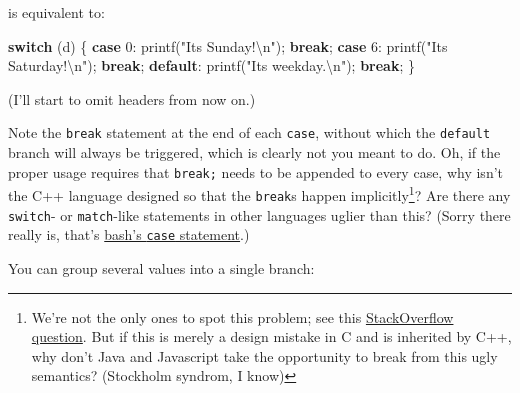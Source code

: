 \documentclass[
]{book}
\newenvironment{Shaded}{\begin{snugshade}}{\end{snugshade}}
\newcommand{\ControlFlowTok}[1]{\textcolor[rgb]{0.13,0.29,0.53}{\textbf{#1}}}
\newcommand{\DecValTok}[1]{\textcolor[rgb]{0.00,0.00,0.81}{#1}}
\newcommand{\NormalTok}[1]{#1}
\newcommand{\SpecialCharTok}[1]{\textcolor[rgb]{0.00,0.00,0.00}{#1}}
\newcommand{\StringTok}[1]{\textcolor[rgb]{0.31,0.60,0.02}{#1}}
\begin{document}
is equivalent to:

\begin{Shaded}
\begin{Highlighting}[]
\ControlFlowTok{switch}\NormalTok{ (d)}
\NormalTok{\{}
\ControlFlowTok{case} \DecValTok{0}\NormalTok{:}
\NormalTok{    printf(}\StringTok{"It\textquotesingle{}s Sunday!}\SpecialCharTok{\textbackslash{}n}\StringTok{"}\NormalTok{);}
    \ControlFlowTok{break}\NormalTok{;}
\ControlFlowTok{case} \DecValTok{6}\NormalTok{:}
\NormalTok{    printf(}\StringTok{"It\textquotesingle{}s Saturday!}\SpecialCharTok{\textbackslash{}n}\StringTok{"}\NormalTok{);}
    \ControlFlowTok{break}\NormalTok{;}
\ControlFlowTok{default}\NormalTok{:}
\NormalTok{    printf(}\StringTok{"It\textquotesingle{}s weekday.}\SpecialCharTok{\textbackslash{}n}\StringTok{"}\NormalTok{);}
    \ControlFlowTok{break}\NormalTok{;}
\NormalTok{\}}
\end{Highlighting}
\end{Shaded}

(I'll start to omit headers from now on.)

Note the \texttt{break} statement at the end of each \texttt{case}, without which the \texttt{default} branch will always be triggered, which is clearly not you meant to do. Oh, if the proper usage requires that \texttt{break;} needs to be appended to every case, why isn't the C++ language designed so that the \texttt{break}s happen implicitly\footnote{We're not the only ones to spot this problem; see this \href{https://stackoverflow.com/questions/252489/why-was-the-switch-statement-designed-to-need-a-break}{StackOverflow question}. But if this is merely a design mistake in C and is inherited by C++, why don't Java and Javascript take the opportunity to break from this ugly semantics? (Stockholm syndrom, I know)}? Are there any \texttt{switch}- or \texttt{match}-like statements in other languages uglier than this? (Sorry there really is, that's \href{https://linuxize.com/post/bash-case-statement/}{bash's \texttt{case} statement}.)

You can group several values into a single branch:
\end{document}
